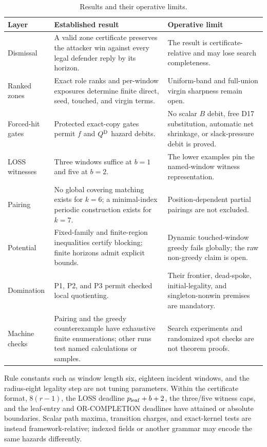 \begin{table}[tbp]
  \centering
  \caption{Results and their operative limits.}
  \label{tab:conclusion-results}
  \small
  \renewcommand{\arraystretch}{1.1}
  \begin{tabular}{@{}p{}p{}p{}@{}}
    \toprule
    Layer & Established result & Operative limit \\
    \midrule
    Dismissal & A valid zone certificate preserves the attacker win against
      every legal defender reply by its horizon. & The result is
      certificate-relative and may lose search completeness. \\
    Ranked zones & Exact role ranks and per-window exposures determine finite
      direct, seed, touched, and virgin terms. & Uniform-band and full-union
      virgin sharpness remain open. \\
    Forced-hit gates & Protected exact-copy gates permit $f$ and $Q^{\mathrm{D}}$
      hazard debits. & No scalar $B$ debit, free D17 substitution, automatic
      net shrinkage, or slack-pressure debit is proved. \\
    LOSS witnesses & Three windows suffice at $b=1$ and five at $b=2$. & The
      lower examples pin the named-window witness representation. \\
    Pairing & No global covering matching exists for $k=6$; a minimal-index
      periodic construction exists for $k=7$. & Position-dependent partial
      pairings are not excluded. \\
    Potential & Fixed-family and finite-region inequalities certify blocking;
      finite horizons admit explicit bounds. & Dynamic touched-window greedy
      fails globally; the raw non-greedy claim is open. \\
    Domination & P1, P2, and P3 permit checked local quotienting. & Their
      frontier, dead-spoke, initial-legality, and singleton-nonwin premises
      are mandatory. \\
    Machine checks & Pairing and the greedy counterexample have exhaustive
      finite enumerations; other runs test named calculations or samples. &
      Search experiments and randomized spot checks are not theorem proofs. \\
    \bottomrule
  \end{tabular}
\end{table}

Rule constants such as window length six, eighteen incident windows, and the
radius-eight legality step are not tuning parameters.  Within the certificate
format, $8(r-1)$, the LOSS deadline $p_{\rm leaf}+b+2$, the three/five witness
caps, and the leaf-entry and OR-COMPLETION deadlines have attained or absolute
boundaries.  Scalar path maxima, transition charges, and exact-kernel tests
are instead framework-relative; indexed fields or another grammar may encode
the same hazards differently.


